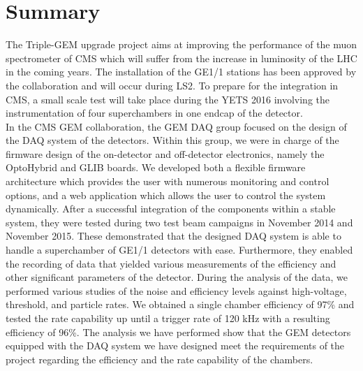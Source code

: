 \chapter{Summary}
\label{chap:II-7-summary}

  The Triple-GEM upgrade project aims at improving the performance of the muon spectrometer of CMS which will suffer from the increase in luminosity of the LHC in the coming years. The installation of the GE1/1 stations has been approved by the collaboration and will occur during LS2. To prepare for the integration in CMS, a small scale test will take place during the YETS 2016 involving the instrumentation of four superchambers in one endcap of the detector. \\

  In the CMS GEM collaboration, the GEM DAQ group focused on the design of the DAQ system of the detectors. Within this group, we were in charge of the firmware design of the on-detector and off-detector electronics, namely the OptoHybrid and GLIB boards. We developed both a flexible firmware architecture which provides the user with numerous monitoring and control options, and a web application which allows the user to control the system dynamically. After a successful integration of the components within a stable system, they were tested during two test beam campaigns in November 2014 and November 2015. These demonstrated that the designed DAQ system is able to handle a superchamber of GE1/1 detectors with ease. Furthermore, they enabled the recording of data that yielded various measurements of the efficiency and other significant parameters of the detector. During the analysis of the data, we performed various studies of the noise and efficiency levels against high-voltage, threshold, and particle rates. We obtained a single chamber efficiency of 97\% and tested the rate capability up until a trigger rate of 120 kHz with a resulting efficiency of 96\%. The analysis we have performed show that the GEM detectors equipped with the DAQ system we have designed meet the requirements of the project regarding the efficiency and the rate capability of the chambers. \\

